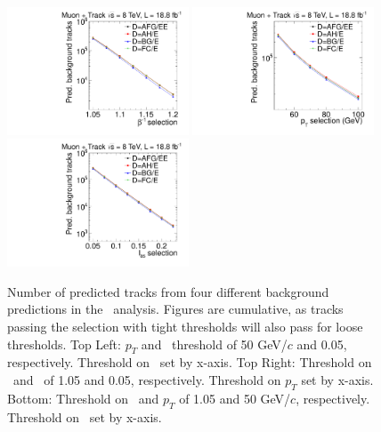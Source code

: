 \begin{figure}
 \begin{center}
  \includegraphics[clip=false, trim=0.0cm 0cm 0.0cm 0cm, width=0.48\textwidth]{figures/tkmu/Systematics_Data8TeV_TOF_Value}
  \includegraphics[clip=false, trim=0.0cm 0cm 0.0cm 0cm, width=0.48\textwidth]{figures/tkmu/Systematics_Data8TeV_P_Value} \\
  \includegraphics[clip=false, trim=0.0cm 0cm 0.0cm 0cm, width=0.48\textwidth]{figures/tkmu/Systematics_Data8TeV_I_Value}
 \end{center}
 \caption[Number of predicted tracks from four different background predictions in the \tktof\ analysis]
{Number of predicted tracks from four different background predictions in the \tktof\ analysis. 
Figures are cumulative, as tracks passing the selection with tight thresholds will also pass for loose thresholds.
Top Left: $p_T$ and \ias\ threshold of 50 GeV/$c$ and 0.05, respectively.
Threshold on \invbeta\ set by x-axis. Top Right: Threshold on \invbeta\  and \ias\ of 1.05 and 0.05, respectively. Threshold on $p_T$ set by x-axis.
Bottom: Threshold on \invbeta\ and $p_T$ of 1.05 and 50 GeV/$c$, respectively. Threshold on \ias\ set by x-axis. }
\label{fig:TkMuMultPred}
\end{figure}

